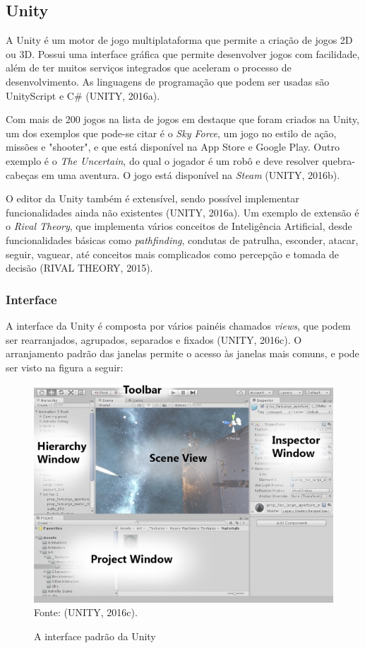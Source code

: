 \documentclass[12pt,a4paper]{article}
\newcommand{\source}[1]{\small Fonte: {#1}}
\begin{document}
	\subsection{Unity}
		A Unity é um motor de jogo multiplataforma que permite a criação de jogos 2D ou 3D.
		Possui uma interface gráfica que permite desenvolver jogos com facilidade,
		além de ter muitos serviços integrados que aceleram o processo de desenvolvimento.
		As linguagens de programação que podem ser usadas são UnityScript e C\#
		(UNITY, 2016a).
		
		Com mais de 200 jogos na lista de jogos em destaque que foram criados na Unity,
		um dos exemplos que pode-se citar é o \textit{Sky Force},
		um jogo no estilo de ação, missões e "shooter",
		e que está disponível na App Store e Google Play.
		Outro exemplo é o \textit{The Uncertain},
		do qual o jogador é um robô e
		deve resolver quebra-cabeças em uma aventura.
		O jogo está disponível na \textit{Steam}
		(UNITY, 2016b).
		
		O editor da Unity também é extensível, sendo possível implementar funcionalidades ainda não existentes
		(UNITY, 2016a).
		Um exemplo de extensão é o \textit{Rival Theory},
		que implementa vários conceitos de Inteligência Artificial,
		desde funcionalidades básicas como \textit{pathfinding},
		condutas de patrulha, esconder, atacar, seguir, vaguear,
		até conceitos mais complicados como percepção e tomada de decisão
		(RIVAL THEORY, 2015).
		
		\subsubsection{Interface}
			A interface da Unity é composta por vários painéis chamados \textit{views},
			que podem ser rearranjados, agrupados, separados e fixados
			(UNITY, 2016c).
			O arranjamento padrão das janelas permite o acesso às janelas mais comuns,
			e pode ser visto na figura a seguir:
			
			\begin{figure}[ht!]
				\label{interfaceUnity}
				\caption{A interface padrão da Unity}
				\centering
				\includegraphics[scale=0.5]{InterfaceUnity.jpg}\\
				\vspace{0.5mm}
				\source{(UNITY, 2016c).}
			\end{figure}	
			
\end{document}
